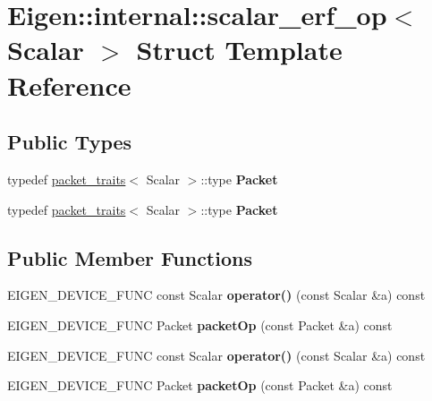 \hypertarget{struct_eigen_1_1internal_1_1scalar__erf__op}{}\section{Eigen\+:\+:internal\+:\+:scalar\+\_\+erf\+\_\+op$<$ Scalar $>$ Struct Template Reference}
\label{struct_eigen_1_1internal_1_1scalar__erf__op}
\subsection*{Public Types}
\begin{DoxyCompactItemize}
\item 
\mbox{\label{struct_eigen_1_1internal_1_1scalar__erf__op_aa67513eee890f6be6caebc94980350eb}} 
typedef \hyperlink{struct_eigen_1_1internal_1_1packet__traits}{packet\+\_\+traits}$<$ Scalar $>$\+::type {\bfseries Packet}
\item 
\mbox{\label{struct_eigen_1_1internal_1_1scalar__erf__op_aa67513eee890f6be6caebc94980350eb}} 
typedef \hyperlink{struct_eigen_1_1internal_1_1packet__traits}{packet\+\_\+traits}$<$ Scalar $>$\+::type {\bfseries Packet}
\end{DoxyCompactItemize}
\subsection*{Public Member Functions}
\begin{DoxyCompactItemize}
\item 
\mbox{\label{struct_eigen_1_1internal_1_1scalar__erf__op_a458d47bb099c9b143b1b2b3826d1c6e4}} 
E\+I\+G\+E\+N\+\_\+\+D\+E\+V\+I\+C\+E\+\_\+\+F\+U\+NC const Scalar {\bfseries operator()} (const Scalar \&a) const
\item 
\mbox{\label{struct_eigen_1_1internal_1_1scalar__erf__op_a92e034e12c2a44424753163054e3b31a}} 
E\+I\+G\+E\+N\+\_\+\+D\+E\+V\+I\+C\+E\+\_\+\+F\+U\+NC Packet {\bfseries packet\+Op} (const Packet \&a) const
\item 
\mbox{\label{struct_eigen_1_1internal_1_1scalar__erf__op_a458d47bb099c9b143b1b2b3826d1c6e4}} 
E\+I\+G\+E\+N\+\_\+\+D\+E\+V\+I\+C\+E\+\_\+\+F\+U\+NC const Scalar {\bfseries operator()} (const Scalar \&a) const
\item 
\mbox{\label{struct_eigen_1_1internal_1_1scalar__erf__op_a92e034e12c2a44424753163054e3b31a}} 
E\+I\+G\+E\+N\+\_\+\+D\+E\+V\+I\+C\+E\+\_\+\+F\+U\+NC Packet {\bfseries packet\+Op} (const Packet \&a) const
\end{DoxyCompactItemize}


